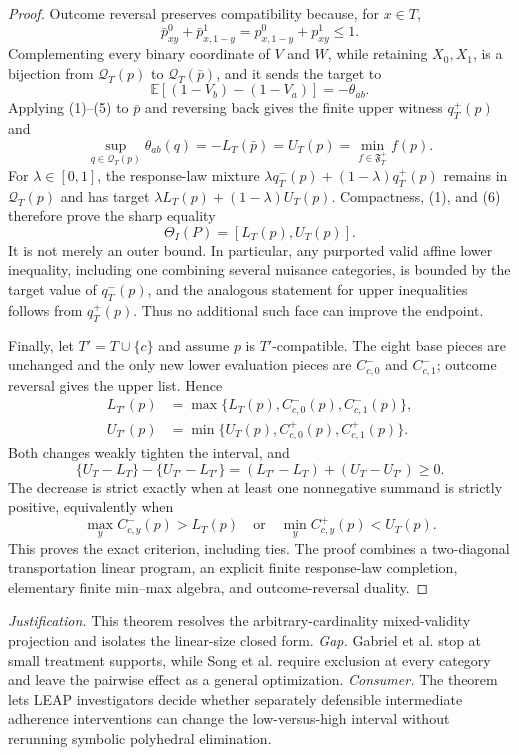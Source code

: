 \documentclass{article}
\begin{document}
\begin{proof}
Outcome reversal preserves compatibility because, for \(x\in T\),
\[
 \bar p^0_{xy}+\bar p^1_{x,1-y}
 =p^0_{x,1-y}+p^1_{xy}\le1.
\]
Complementing every binary coordinate of \(V\) and \(W\), while retaining
\(X_0,X_1\), is a bijection from \(\mathcal Q_T(p)\) to
\(\mathcal Q_T(\bar p)\), and it sends the target to
\[
 \mathbb E[(1-V_b)-(1-V_a)]=-\theta_{ab}.
\]
Applying (1)--(5) to \(\bar p\) and reversing back gives the finite upper
witness \(q^+_T(p)\) and
\[
 \sup_{q\in\mathcal Q_T(p)}\theta_{ab}(q)
 =-L_T(\bar p)=U_T(p)
 =\min_{f\in\mathfrak F^+_T}f(p). \tag{6}
\]
For \(\lambda\in[0,1]\), the response-law mixture
\(\lambda q^-_T(p)+(1-\lambda)q^+_T(p)\) remains in
\(\mathcal Q_T(p)\) and has target
\(\lambda L_T(p)+(1-\lambda)U_T(p)\).  Compactness, (1), and (6) therefore
prove the sharp equality
\[
 \Theta_I(P)=[L_T(p),U_T(p)].
\]
It is not merely an outer bound.  In particular, any purported valid affine
lower inequality, including one combining several nuisance categories, is
bounded by the target value of \(q^-_T(p)\), and the analogous statement for
upper inequalities follows from \(q^+_T(p)\).  Thus no additional such face
can improve the endpoint.

Finally, let \(T'=T\cup\{c\}\) and assume \(p\) is \(T'\)-compatible.  The
eight base pieces are unchanged and the only new lower evaluation pieces
are \(C^-_{c,0}\) and \(C^-_{c,1}\); outcome reversal gives the upper list.
Hence
\[
\begin{aligned}
 L_{T'}(p)&=\max\{L_T(p),C^-_{c,0}(p),C^-_{c,1}(p)\},\\
 U_{T'}(p)&=\min\{U_T(p),C^+_{c,0}(p),C^+_{c,1}(p)\}.
\end{aligned}
\]
Both changes weakly tighten the interval, and
\[
 \{U_T-L_T\}-\{U_{T'}-L_{T'}\}
 =(L_{T'}-L_T)+(U_T-U_{T'})\ge0.
\]
The decrease is strict exactly when at least one nonnegative summand is
strictly positive, equivalently when
\[
 \max_y C^-_{c,y}(p)>L_T(p)
 \quad\text{or}\quad
 \min_y C^+_{c,y}(p)<U_T(p).
\]
This proves the exact criterion, including ties.  The proof combines a
two-diagonal transportation linear program, an explicit finite response-law
completion, elementary finite min--max algebra, and outcome-reversal
duality.
\end{proof}
\par\smallskip\noindent \textit{Justification.} This theorem resolves the arbitrary-cardinality mixed-validity projection and isolates the linear-size closed form. \textit{Gap.} Gabriel et al. stop at small treatment supports, while Song et al. require exclusion at every category and leave the pairwise effect as a general optimization. \textit{Consumer.} The theorem lets LEAP investigators decide whether separately defensible intermediate adherence interventions can change the low-versus-high interval without rerunning symbolic polyhedral elimination.
\end{document}
